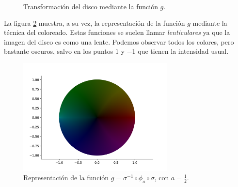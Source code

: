 \begin{example}
\begin{figure}[!htbp]
        \caption{Transformación del disco mediante la función $g$.}
        \label{fig:ejemplo}
    \end{figure}

    La figura \ref{fig:lente} muestra, a su vez, la representación de la función $g$ mediante la técnica del coloreado. Estas funciones se suelen llamar \textit{lenticulares} ya que la imagen del disco es como una lente. Podemos observar todos los colores, pero bastante oscuros, salvo en los puntos $1$ y $-1$ que tienen la intensidad usual. \\

    \begin{figure}[!htbp]
        \centering
        \includegraphics[width=0.7\textwidth]{../Aplicacion/lente.png}
        \caption{Representación de la función $g = \sigma^{-1} \circ \phi_a \circ \sigma$, con $a = \frac{1}{2}$.}
        \label{fig:lente}
    \end{figure}


\end{example}
